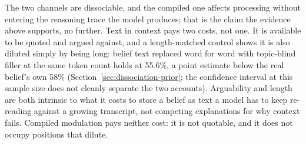 The two channels are dissociable, and the compiled one affects processing without
entering the reasoning trace the model produces; that is the claim the evidence above
supports, no further. Text in context pays two costs, not one. It is available to be
quoted and argued against, and a length-matched control shows it is also diluted simply
by being long: belief text replaced word for word with topic-blind filler at the same
token count holds at 55.6\%, a point estimate below the real belief's own 58\%
(Section~\ref{sec:dissociation-prior}; the confidence interval at this sample size does
not cleanly separate the two accounts). Arguability and length are both intrinsic to
what it costs to store a belief as text a model has to keep re-reading against a
growing transcript, not competing explanations for why context fails. Compiled
modulation pays neither cost: it is not quotable, and it does not occupy positions that
dilute.
